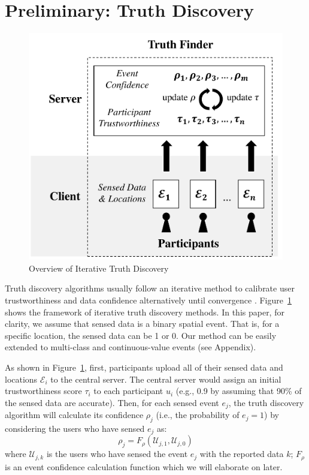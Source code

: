 \section{Preliminary: Truth Discovery}
\label{sec:preliminary}

\begin{figure}
	\centering
	\includegraphics[width=.5\linewidth]{submissions/LeyeWang/fig/truthfinder.pdf}
	\caption{Overview of Iterative Truth Discovery}
	\label{fig:truthfinder}
	\vspace{-1em}
\end{figure}


Truth discovery algorithms usually follow an iterative method to calibrate user trustworthiness and data confidence alternatively until convergence \citep{yin2008truth}. Figure~\ref{fig:truthfinder} shows the framework of iterative truth discovery methods. In this paper, for clarity, we assume that sensed data is a binary spatial event. That is, for a specific location, the sensed data can be 1 or 0. Our method can be easily extended to multi-class and continuous-value events (see Appendix).

As shown in Figure~\ref{fig:truthfinder}, first, participants upload all of their sensed data and locations $\mathcal E_i$  to the central server. The central server would assign an initial trustworthiness score $\tau_i$ to each participant $u_i$ (e.g., 0.9 by assuming that 90\% of the sensed data are accurate). Then, for each sensed event $e_j$, the truth discovery algorithm will calculate its confidence $\rho_j$ (i.e., the probability of $e_j = 1$) by considering the users who have sensed $e_j$ as:
\begin{equation}
\rho_j = F_\rho(\mathcal U_{j,1}, \mathcal U_{j,0})
\label{eq:event_confidence}
\end{equation}
where $\mathcal U_{j,k}$ is the users who have sensed the event $e_j$ with the reported data $k$; $F_\rho$ is an event confidence calculation function which we will elaborate on later.

